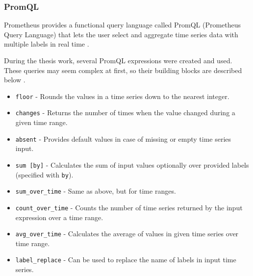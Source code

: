 \subsubsection{PromQL} \label{background-promql}

Prometheus provides a functional query language called PromQL (Prometheus Query Language) that lets the user select and aggregate time series data with multiple labels in real time \cite{PrometheusQueryingBasics}.

During the thesis work, several PromQL expressions were created and used. These queries may seem complex at first, so their building blocks are described below \cite{PrometheusQueryingFunctions} \cite{PrometheusQueryingOperators}.

\begin{itemize}
	\item \texttt{floor} - Rounds the values in a time series down to the nearest integer.
	\item \texttt{changes} - Returns the number of times when the value changed during a given time range.
	\item \texttt{absent} - Provides default values in case of missing or empty time series input.
	\item \texttt{sum [by]} - Calculates the sum of input values optionally over provided labels (specified with \texttt{by}).
	\item \texttt{sum\_over\_time} - Same as above, but for time ranges.
	\item \texttt{count\_over\_time} - Counts the number of time series returned by the input expression over a time range.
	\item \texttt{avg\_over\_time} - Calculates the average of values in given time series over time range.
	\item \texttt{label\_replace} - Can be used to replace the name of labels in input time series.
\end{itemize}


